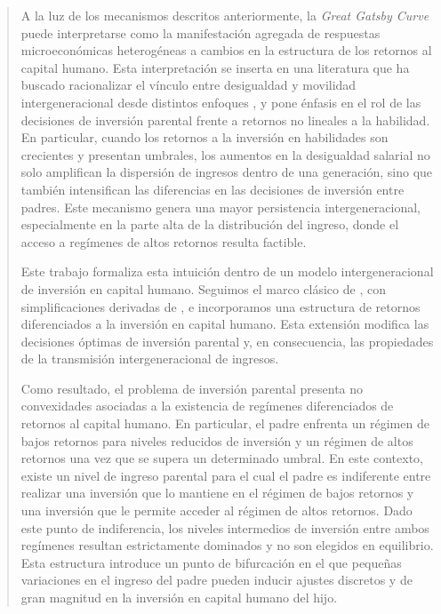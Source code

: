 \documentclass[12pt]{article}
\begin{document}
\begin{abstract}
A la luz de los mecanismos descritos anteriormente, la \emph{Great Gatsby Curve} puede interpretarse como la manifestación agregada de respuestas microeconómicas heterogéneas a cambios en la estructura de los retornos al capital humano. Esta interpretación se inserta en una literatura que ha buscado racionalizar el vínculo entre desigualdad y movilidad intergeneracional desde distintos enfoques \parencite{Becker_2018,Durlauf_2018,BouchardSt-Amant2024}, y pone énfasis en el rol de las decisiones de inversión parental frente a retornos no lineales a la habilidad. En particular, cuando los retornos a la inversión en habilidades son crecientes y presentan umbrales, los aumentos en la desigualdad salarial no solo amplifican la dispersión de ingresos dentro de una generación, sino que también intensifican las diferencias en las decisiones de inversión entre padres. Este mecanismo genera una mayor persistencia intergeneracional, especialmente en la parte alta de la distribución del ingreso, donde el acceso a regímenes de altos retornos resulta factible.

Este trabajo formaliza esta intuición dentro de un modelo intergeneracional de inversión en capital humano. Seguimos el marco clásico de \textcite{Becker_Tomes_1979}, con simplificaciones derivadas de \textcite{Solon_1999}, e incorporamos una estructura de retornos diferenciados a la inversión en capital humano. Esta extensión modifica las decisiones óptimas de inversión parental y, en consecuencia, las propiedades de la transmisión intergeneracional de ingresos.

Como resultado, el problema de inversión parental presenta no convexidades asociadas a la existencia de regímenes diferenciados de retornos al capital humano. En particular, el padre enfrenta un régimen de bajos retornos para niveles reducidos de inversión y un régimen de altos retornos una vez que se supera un determinado umbral. En este contexto, existe un nivel de ingreso parental para el cual el padre es indiferente entre realizar una inversión que lo mantiene en el régimen de bajos retornos y una inversión que le permite acceder al régimen de altos retornos. Dado este punto de indiferencia, los niveles intermedios de inversión entre ambos regímenes resultan estrictamente dominados y no son elegidos en equilibrio. Esta estructura introduce un punto de bifurcación en el que pequeñas variaciones en el ingreso del padre pueden inducir ajustes discretos y de gran magnitud en la inversión en capital humano del hijo.


\end{abstract}
\end{document}
